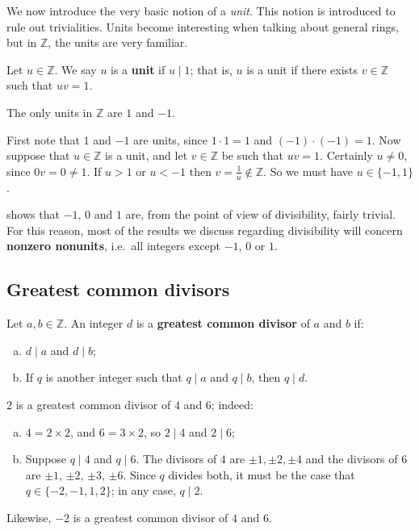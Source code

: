 We now introduce the very basic notion of a \textit{unit}. This notion is introduced to rule out trivialities. Units become interesting when talking about general rings, but in $\mathbb{Z}$, the units are very familiar.

\begin{definition}
Let $u \in \mathbb{Z}$. We say $u$ is a \textbf{unit} if $u \mid 1$; that is, $u$ is a unit if there exists $v \in \mathbb{Z}$ such that $uv=1$.
\end{definition}

\begin{proposition}\label{propUnitsOfZ}
The only units in $\mathbb{Z}$ are $1$ and $-1$.
\end{proposition}
\begin{cproof}
First note that $1$ and $-1$ are units, since $1 \cdot 1 = 1$ and $(-1) \cdot (-1) = 1$. Now suppose that $u \in \mathbb{Z}$ is a unit, and let $v \in \mathbb{Z}$ be such that $uv=1$. Certainly $u \ne 0$, since $0v=0 \ne 1$. If $u>1$ or $u<-1$ then $v = \frac{1}{u} \not \in \mathbb{Z}$. So we must have $u \in \{ -1, 1 \}$.
\end{cproof}

 shows that $-1$, $0$ and $1$ are, from the point of view of divisibility, fairly trivial. For this reason, most of the results we discuss regarding divisibility will concern \textbf{nonzero nonunits}, i.e.\ all integers except $-1$, $0$ or $1$.

\subsection*{Greatest common divisors}

\begin{definition}
\label{defGCD}
Let $a, b \in \mathbb{Z}$. An integer $d$ is a \textbf{greatest common divisor} of $a$ and $b$ if:
\begin{enumerate}[(a)]
\item $d \mid a$ and $d \mid b$;
\item If $q$ is another integer such that $q \mid a$ and $q \mid b$, then $q \mid d$.
\end{enumerate}
\end{definition}

\begin{example}
\label{exGCDsOfFourAndSix}
$2$ is a greatest common divisor of $4$ and $6$; indeed:
\begin{enumerate}[(a)]
\item $4 = 2 \times 2$, and $6 = 3 \times 2$, so $2 \mid 4$ and $2 \mid 6$;
\item Suppose $q \mid 4$ and $q \mid 6$. The divisors of $4$ are $\pm 1, \pm 2, \pm 4$ and the divisors of $6$ are $\pm 1$, $\pm 2$, $\pm 3$, $\pm 6$. Since $q$ divides both, it must be the case that $q \in \{ {-2}, {-1}, 1, 2 \}$; in any case, $q \mid 2$.
\end{enumerate}
Likewise, $-2$ is a greatest common divisor of $4$ and $6$.
\end{example}

